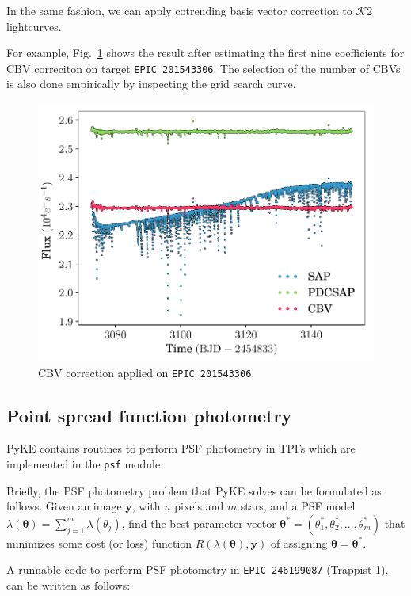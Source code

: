\documentclass{article}
\begin{document}
In the same fashion, we can apply cotrending basis vector correction to
$\mathcal{K}\mathit{2}$ lightcurves.

For example, Fig.~\ref{fig:cbv-correction-k2} shows the result after estimating
the first nine coefficients for CBV correciton on target \texttt{EPIC 201543306}.
The selection of the number of CBVs is also done empirically by inspecting the
grid search curve.
\begin{figure}[!htb]
    \centering
    \includegraphics[scale=.5]{figs/cbv-k2.pdf}
    \caption{CBV correction applied on \texttt{EPIC 201543306}.}
    \label{fig:cbv-correction-k2}
\end{figure}

\subsection{Point spread function photometry}

PyKE contains routines to perform PSF photometry in TPFs
which are implemented in the \texttt{psf} module.

Briefly, the PSF photometry problem that PyKE solves can be formulated as
follows. Given an image $\bm{y}$, with $n$ pixels and $m$ stars, and a PSF model
$\lambda(\bm{\theta}) = \sum_{j=1}^{m} \lambda({\theta}_j)$,
find the best parameter vector
$\bm{\theta}^{*} = (\theta_1^{*}, \theta_2^{*}, ..., \theta_m^{*})$
that minimizes some cost (or loss) function $R(\lambda(\bm{\theta}), \bm{y})$
of assigning $\bm{\theta} = \bm{\theta}^{*}$.

A runnable code to perform PSF photometry in \texttt{EPIC 246199087}
(Trappist-1), can be written as follows:
\end{document}
